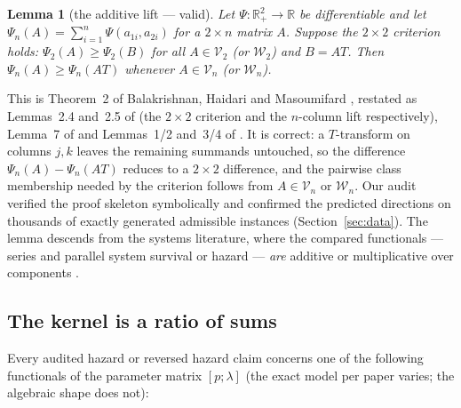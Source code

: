 \documentclass[10pt]{article}
\theoremstyle{plain}
\newtheorem{lemma}[theorem]{Lemma}
\theoremstyle{definition}
\theoremstyle{remark}
\newcommand{\R}{\mathbb{R}}
\newcommand{\Vn}{\mathcal V_n}
\newcommand{\Wn}{\mathcal W_n}
\begin{document}
\begin{lemma}[the additive lift --- valid]\label{lem:additive}
Let $\Psi:\R_+^2\to\R$ be differentiable and let $\Psi_n(A)=\sum_{i=1}^n\Psi(a_{1i},a_{2i})$ for a $2\times n$ matrix $A$. Suppose the $2\times2$ criterion holds: $\Psi_2(A)\ge\Psi_2(B)$ for all $A\in\mathcal V_2$ (or $\mathcal W_2$) and $B=AT$. Then $\Psi_n(A)\ge\Psi_n(AT)$ whenever $A\in\Vn$ (or $\Wn$).
\end{lemma}

This is Theorem~2 of Balakrishnan, Haidari and Masoumifard \cite{BalakrishnanHaidariMasoumifard2015}, restated as Lemmas~2.4 and~2.5 of \cite{BarmalzanKosariBalakrishnan2022} (the $2\times2$ criterion and the $n$-column lift respectively), Lemma~7 of \cite{ShekariEtAl2026} and Lemmas~1/2 and~3/4 of \cite{GuoYan2024,SahooKayalBalakrishnan2026}. It is correct: a $T$-transform on columns $j,k$ leaves the remaining summands untouched, so the difference $\Psi_n(A)-\Psi_n(AT)$ reduces to a $2\times2$ difference, and the pairwise class membership needed by the criterion follows from $A\in\Vn$ or $\Wn$. Our audit verified the proof skeleton symbolically and confirmed the predicted directions on thousands of exactly generated admissible instances (Section~\ref{sec:data}). The lemma descends from the systems literature, where the compared functionals --- series and parallel system survival or hazard --- \emph{are} additive or multiplicative over components \cite{DykstraKocharRojo1997,KhalediKochar2000,BalakrishnanHaidariMasoumifard2015}.

\subsection{The kernel is a ratio of sums}\label{sec:kernels}

Every audited hazard or reversed hazard claim concerns one of the following functionals of the parameter matrix $[p;\lambda]$ (the exact model per paper varies; the algebraic shape does not):
\end{document}
